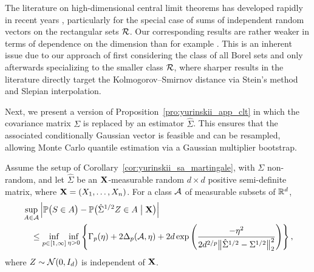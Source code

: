\begin{remark}

  The literature on high-dimensional central limit theorems
  has developed rapidly in recent years
  \citep[see][and references therein]{%
    zhai2018high,%
    koike2021notes,%
    buzun2022strong,%
    lopes2022central,%
    chernozhukov2023nearly%
  },
  particularly for the special case of
  sums of independent random vectors
  on the rectangular sets $\mathcal{R}$.
  Our corresponding results are rather weaker in terms of
  dependence on the dimension than for example
  \citet[Theorem~2.1]{chernozhukov2023nearly}.
  This is an inherent issue due to our approach of first
  considering the class of all Borel sets
  and only afterwards specializing to the smaller class $\mathcal{R}$,
  where sharper results in the literature directly target the
  Kolmogorov--Smirnov distance via Stein's method and Slepian interpolation.
\end{remark}

Next, we present a version of Proposition~\ref{pro:yurinskii_app_clt} in which
the covariance
matrix $\Sigma$ is replaced by an estimator $\hat \Sigma$. This ensures that
the associated conditionally Gaussian vector is feasible and can be resampled,
allowing Monte Carlo quantile estimation via a Gaussian
multiplier bootstrap.

\begin{proposition}%
  \label{pro:yurinskii_app_bootstrap}

  Assume the setup of Corollary~\ref{cor:yurinskii_sa_martingale},
  with $\Sigma$ non-random,
  and let $\hat \Sigma$ be an $\mathbf{X}$-measurable random
  $d \times d$ positive semi-definite matrix,
  where $\mathbf{X} = (X_1, \ldots, X_n)$.
  For a class $\mathcal{A}$ of measurable subsets of $\mathbb{R}^d$,
  \begin{align*}
    &\sup_{A\in \mathcal{A}}
    \left|
    \mathbb{P}\big(S \in A\big)
    - \mathbb{P}\big(\hat \Sigma^{1/2} Z \in A \bigm| \mathbf{X} \big)
    \right| \\
    &\quad\leq
    \inf_{p \in [1,\infty]} \inf_{\eta>0}
    \left\{ \Gamma_p(\eta) + 2 \Delta_p(\mathcal{A}, \eta)
      + 2d \exp\left(\frac{-\eta^2}
        {2d^{2/p}\big\|\hat \Sigma^{1/2} - \Sigma^{1/2}\big\|_2^2}
      \right)
    \right\},
  \end{align*}
  where $Z \sim \mathcal{N}(0,I_d)$ is independent of $\mathbf{X}$.
\end{proposition}

